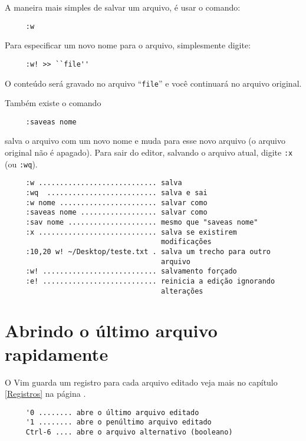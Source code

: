 A maneira mais simples de salvar um arquivo, é usar o comando:

\begin{verbatim}
     :w
\end{verbatim}


Para especificar um novo nome para o arquivo, simplesmente digite:

\begin{verbatim}
     :w! >> ``file''
\end{verbatim}

O conteúdo será gravado no arquivo ``{\tt file}'' e você continuará no arquivo original.

Também existe o comando

\begin{verbatim}
     :saveas nome
\end{verbatim}

salva o arquivo com um novo nome e muda para esse novo arquivo (o arquivo
original não é apagado).  Para sair do editor, salvando o arquivo atual, digite
{\tt :x} (ou {\tt :wq}).

\begin{verbatim}
     :w ............................ salva
     :wq  .......................... salva e sai
     :w nome ....................... salvar como
     :saveas nome .................. salvar como
     :sav nome ..................... mesmo que "saveas nome"
     :x ............................ salva se existirem 
                                     modificações
     :10,20 w! ~/Desktop/teste.txt . salva um trecho para outro 
                                     arquivo
     :w! ........................... salvamento forçado
     :e! ........................... reinicia a edição ignorando 
                                     alterações
\end{verbatim}


\section{Abrindo o último arquivo rapidamente}

O Vim guarda um registro para cada arquivo editado veja
mais no capítulo \ref{Registros} na página \pageref{Registros}.

\begin{verbatim}
     '0 ........ abre o último arquivo editado
     '1 ........ abre o penúltimo arquivo editado
     Ctrl-6 .... abre o arquivo alternativo (booleano)
\end{verbatim}

